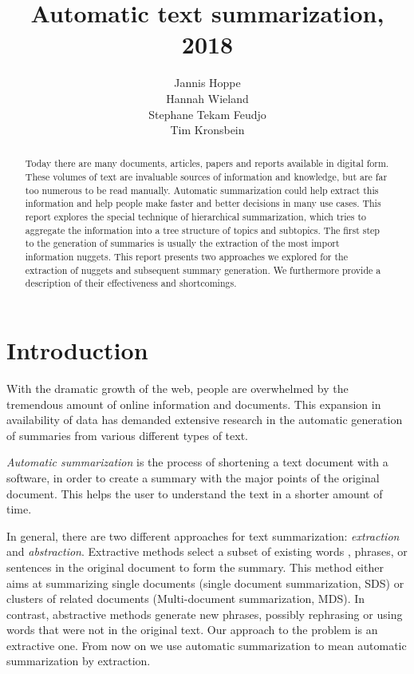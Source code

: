 \documentclass{article}
\title{Automatic text summarization, 2018}
\author{
  Jannis Hoppe\\
  \And
  Hannah Wieland\\
  \And
  Stephane Tekam Feudjo\\
  \And
  Tim Kronsbein\\
}
\begin{document}

\maketitle


\begin{abstract}
  Today there are many documents, articles, papers and reports available in digital form. These volumes of text are invaluable sources of information and knowledge, but are far too numerous to be read manually. Automatic summarization could help extract this information and help people make faster and better decisions in many use cases. This report explores the special technique of hierarchical summarization, which tries to aggregate the information into a tree structure of topics and subtopics. The first step to the generation of summaries is usually the extraction of the most import information nuggets. This report presents two approaches we explored for the extraction of nuggets and subsequent summary generation. We furthermore provide a description of their effectiveness and shortcomings. 
  
\end{abstract}

\section{Introduction}

\label{sec:intro}

With the dramatic growth of the web, people are overwhelmed by the tremendous amount of online information and documents. This expansion in availability of data has demanded extensive research in the automatic generation of summaries from various different types of text.

\textit{Automatic summarization} is the process of shortening a text document with a software, in order to create a summary with the major points of the original document. This helps the user to understand the text in a shorter amount of time.	     

In general, there  are two different approaches for text summarization: \textit{extraction} and \textit{abstraction}. Extractive methods select a subset of existing words , phrases, or sentences in the original document to form the summary. This method either aims at summarizing single documents (single document summarization, SDS) or clusters of related documents (Multi-document summarization, MDS). In contrast, abstractive methods generate new phrases, possibly rephrasing or using words that were not in the original text. Our approach to the problem is an extractive one. From now on we use automatic summarization to mean automatic summarization by extraction. 
\end{document}
